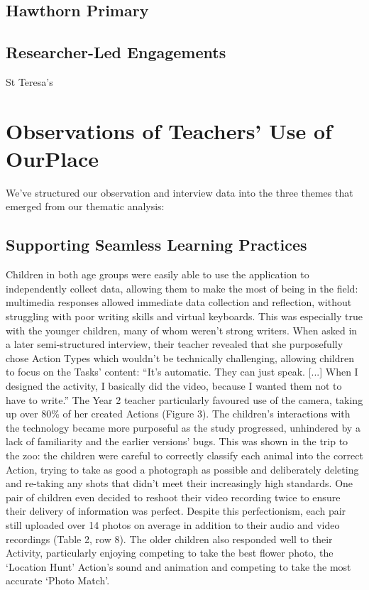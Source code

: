 \subsection{Hawthorn Primary}

\subsection{Researcher-Led Engagements}

St Teresa's

\section{Observations of Teachers' Use of OurPlace}

We’ve structured our observation and interview data into the three themes that emerged from our thematic analysis:

\subsection{Supporting Seamless Learning Practices}

Children in both age groups were easily able to use the application to
independently collect data, allowing them to make the most of being in the
field: multimedia responses allowed immediate data collection and reflection,
without struggling with poor writing skills and virtual keyboards. This was
especially true with the younger children, many of whom weren’t strong writers.
When asked in a later semi-structured interview, their teacher revealed that she
purposefully chose Action Types which wouldn’t be technically challenging,
allowing children to focus on the Tasks’ content: “It’s automatic. They can just
speak. [...] When I designed the activity, I basically did the video, because I
wanted them not to have to write.” The Year 2 teacher particularly favoured use
of the camera, taking up over 80\% of her created Actions (Figure 3). The
children’s interactions with the technology became more purposeful as the study
progressed, unhindered by a lack of familiarity and the earlier versions’ bugs.
This was shown in the trip to the zoo: the children were careful to correctly
classify each animal into the correct Action, trying to take as good a
photograph as possible and deliberately deleting and re-taking any shots that
didn’t meet their increasingly high standards. One pair of children even decided
to reshoot their video recording twice to ensure their delivery of information
was perfect. Despite this perfectionism, each pair still uploaded over 14 photos
on average in addition to their audio and video recordings (Table 2, row 8). The
older children also responded well to their Activity, particularly enjoying
competing to take the best flower photo, the ‘Location Hunt’ Action’s sound and
animation and competing to take the most accurate ‘Photo Match’.

